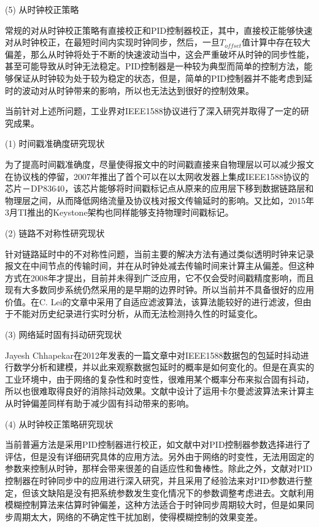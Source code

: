 (5) 从时钟校正策略

常规的对从时钟校正策略有直接校正和PID控制器校正，其中，直接校正能够快速对从时钟校正，在最短时间内实现时钟同步，然后，一旦$T_{offset}$值计算中存在较大偏差，那么从时钟将处于不断的快速波动当中，这会严重破坏从时钟的同步性能，甚至可能导致从时钟无法稳定。PID控制器是一种较为典型而简单的控制方法，能够保证从时钟较为处于较为稳定的状态，但是，简单的PID控制器并不能考虑到延时的波动对从时钟带来的影响，所以也无法达到很好的控制效果。

当前针对上述所问题，工业界对IEEE1588协议\supercite{2}进行了深入研究并取得了一定的研究成果。

(1) 时间戳准确度研究现状

为了提高时间戳准确度，尽量使得报文中的时间戳直接来自物理层以可以减少报文在协议栈的停留，2007年推出了首个可以在以太网收发器上集成IEEE1588协议的芯片－DP83640\supercite{4}，该芯片能够将时间戳标记点从原来的应用层下移到数据链路层和物理层之间，从而降低网络流量及协议栈对报文传输延时的影响。又比如，2015年3月TI推出的Keystone架构也同样能够支持物理时间戳标记\supercite{5}。

(2) 链路不对称性研究现状

针对链路延时中的不对称性问题，当前主要的解决方法有通过类似透明时钟来记录报文在中间节点的传输时间，并在从时钟处减去传输时间来计算主从偏差。但这种方式在2008年才提出，目前并未得到广泛应用，它不仅会受时间戳精度影响，而且现有大多数同步系统仍然采用的是早期的边界时钟。所以当前并不具备很好的应用价值。在C. Lei的文章\parencite{57}中采用了自适应滤波算法，该算法能较好的进行滤波，但由于不能对历史纪录进行实时分析，从而无法检测持久性的时延变化。

(3) 网络延时固有抖动研究现状

Jayesh Chhapekar在2012年发表的一篇文章中对IEEE1588数据包的包延时抖动进行数学分析和建模，并以此来观察数据包延时的概率是如何变化的\supercite{8}。但是在真实的工业环境中，由于网络的复杂性和时变性，很难用某个概率分布来拟合固有抖动，所以也很难取得良好的消除抖动效果。文献\parencite{9}中设计了运用卡尔曼滤波算法来计算主从时钟偏差同样有助于减少固有抖动带来的影响。

(4) 从时钟校正策略研究现状

当前普遍方法是采用PID控制器进行校正，如文献\parencite{10}中对PID控制器参数选择进行了评估，但是没有详细研究具体的应用方法。另外由于网络的时变性，无法用固定的参数来控制从时钟，那样会带来很差的自适应性和鲁棒性。除此之外，文献\parencite{11}对PID控制器在时钟同步中的应用进行深入研究，并且采用了经验法来对PID参数进行整定，但该文缺陷是没有把系统参数发生变化情况下的参数调整考虑进去。文献\parencite{12}利用模糊控制算法来估算时钟偏差，这种方法适合于时钟同步周期较大时，但是如果同步周期太大，网络的不确定性干扰加剧，使得模糊控制的效果变差。

